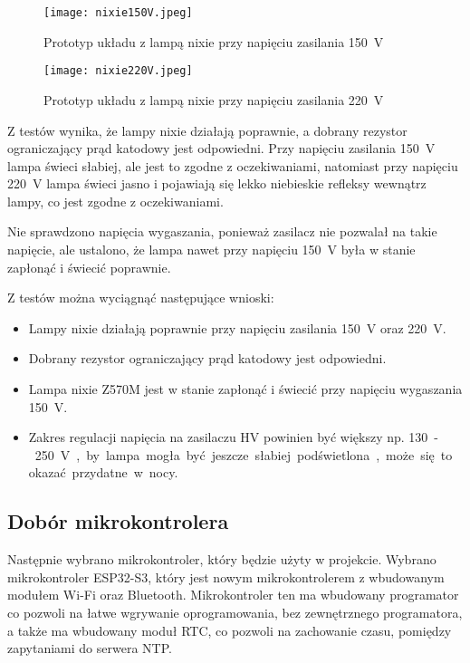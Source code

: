 \documentclass{article}
\begin{document}
\begin{figure}[H]
    \centering
    \texttt{[image: nixie150V.jpeg]}
    \caption{Prototyp układu z lampą nixie przy napięciu zasilania \SI{150}{\volt}}
\end{figure}

\begin{figure}[H]
    \centering
    \texttt{[image: nixie220V.jpeg]}
    \caption{Prototyp układu z lampą nixie przy napięciu zasilania \SI{220}{\volt}}
\end{figure}

Z testów wynika, że lampy nixie działają poprawnie, a dobrany rezystor ograniczający prąd katodowy jest odpowiedni. 
Przy napięciu zasilania \SI{150}{\volt} lampa świeci słabiej, ale jest to zgodne z oczekiwaniami,
natomiast przy napięciu \SI{220}{\volt} lampa świeci jasno i pojawiają się lekko niebieskie refleksy wewnątrz lampy, co jest zgodne z oczekiwaniami.

Nie sprawdzono napięcia wygaszania, ponieważ zasilacz nie pozwalał na takie napięcie, 
ale ustalono, że lampa nawet przy napięciu \SI{150}{\volt} była w stanie zapłonąć i świecić poprawnie.

Z testów można wyciągnąć następujące wnioski:

\begin{itemize}
    \item Lampy nixie działają poprawnie przy napięciu zasilania \SI{150}{\volt} oraz \SI{220}{\volt}.
    \item Dobrany rezystor ograniczający prąd katodowy jest odpowiedni.
    \item Lampa nixie Z570M jest w stanie zapłonąć i świecić przy napięciu wygaszania \SI{150}{\volt}.
    \item Zakres regulacji napięcia na zasilaczu HV powinien być większy np. \SI{130}-\SI{250}{\volt}, by lampa mogła być jeszcze słabiej podświetlona, może się to okazać przydatne w nocy.
\end{itemize}

\subsection{Dobór mikrokontrolera}

Następnie wybrano mikrokontroler, który będzie użyty w projekcie. Wybrano mikrokontroler ESP32-S3, który jest nowym mikrokontrolerem z wbudowanym modułem Wi-Fi oraz Bluetooth.
Mikrokontroler ten ma wbudowany programator co pozwoli na łatwe wgrywanie oprogramowania, bez zewnętrznego programatora, a także ma wbudowany moduł RTC,
co pozwoli na zachowanie czasu, pomiędzy zapytaniami do serwera NTP.
\end{document}
